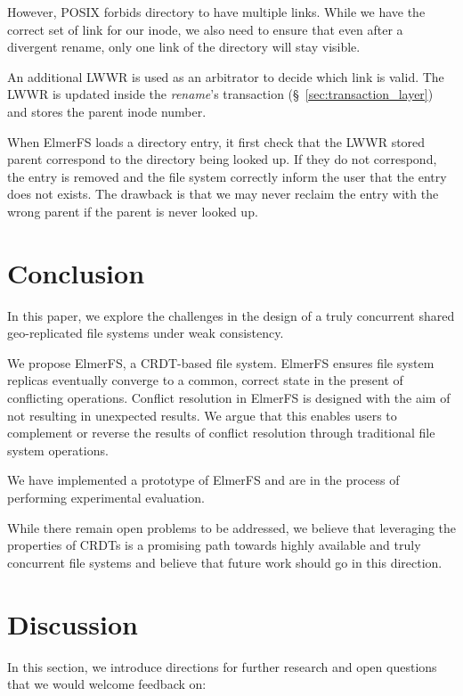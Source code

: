 \documentclass[sigconf, 10pt]{acmart}
\begin{document}
However, POSIX forbids directory to have multiple links. While we have the correct set of link
for our inode, we also need to ensure that even after a divergent rename, only one link of the
directory will stay visible.

An additional LWWR is used as an arbitrator to decide which link is valid. The LWWR is updated inside
the \textit{rename}'s transaction (\S~\ref{sec:transaction_layer}) and stores the parent inode number.

When ElmerFS loads a directory entry, it first check that the LWWR stored parent correspond to
the directory being looked up. If they do not correspond, the entry is removed and the file system
correctly inform the user that the entry does not exists. The drawback is that we may never reclaim
the entry with the wrong parent if the parent is never looked up.

\section{Conclusion}

In this paper, we explore the challenges in the design of a truly
concurrent shared geo-replicated file systems under weak consistency.

We propose ElmerFS, a CRDT-based file system.
ElmerFS ensures file system replicas eventually converge to a common,
correct state in the present of conflicting operations.
Conflict resolution in ElmerFS is designed with the aim of
not resulting in unexpected results.
We argue that this enables users to complement or reverse the results of conflict resolution
through traditional file system operations.

We have implemented a prototype of ElmerFS and are in the process of performing
experimental evaluation.

While there remain open problems to be addressed,
we believe that leveraging the properties of CRDTs is a promising path towards
highly available and truly concurrent file systems and believe that future
work should go in this direction.

\section{Discussion}

In this section, we introduce directions for further research and open questions that
we would welcome feedback on:
\end{document}
